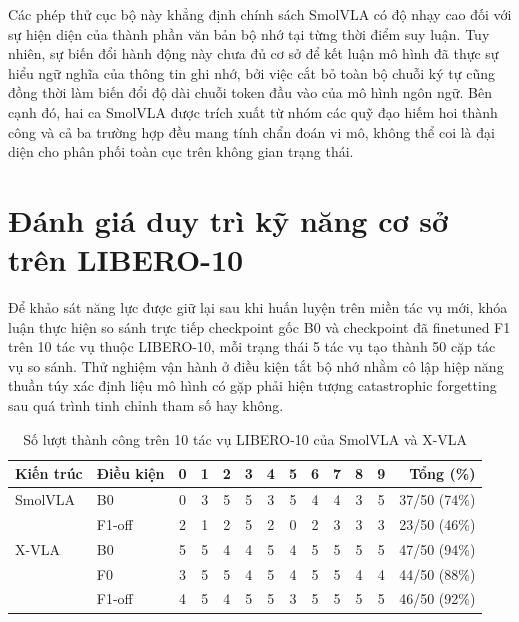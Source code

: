 Các phép thử cục bộ này khẳng định chính sách SmolVLA có độ nhạy cao đối với sự hiện diện của thành phần văn bản bộ nhớ tại từng thời điểm suy luận. Tuy nhiên, sự biến đổi hành động này chưa đủ cơ sở để kết luận mô hình đã thực sự hiểu ngữ nghĩa của thông tin ghi nhớ, bởi việc cắt bỏ toàn bộ chuỗi ký tự cũng đồng thời làm biến đổi độ dài chuỗi token đầu vào của mô hình ngôn ngữ. Bên cạnh đó, hai ca SmolVLA được trích xuất từ nhóm các quỹ đạo hiếm hoi thành công và cả ba trường hợp đều mang tính chẩn đoán vi mô, không thể coi là đại diện cho phân phối toàn cục trên không gian trạng thái.

\section{Đánh giá duy trì kỹ năng cơ sở trên LIBERO-10}
\label{sec:e6-retention}

Để khảo sát năng lực được giữ lại sau khi huấn luyện trên miền tác vụ mới, khóa luận thực hiện so sánh trực tiếp checkpoint gốc B0 và checkpoint đã finetuned F1 trên 10 tác vụ thuộc LIBERO-10, mỗi trạng thái 5 tác vụ tạo thành 50 cặp tác vụ so sánh. Thử nghiệm vận hành ở điều kiện tắt bộ nhớ nhằm cô lập hiệp năng thuần túy xác định liệu mô hình có gặp phải hiện tượng catastrophic forgetting sau quá trình tinh chỉnh tham số hay không.

\begin{table}[htbp]
\centering\small
\caption{Số lượt thành công trên 10 tác vụ LIBERO-10 của SmolVLA và X-VLA}
\label{tab:e6-retention-combined}
\label{tab:e6-retention-results}
\label{tab:xvla-e6-results}
\setlength{\tabcolsep}{2.5pt}
\begin{tabular}{l|l|*{10}{c}|r}
\toprule
\textbf{Kiến trúc} & \textbf{Điều kiện} & \textbf{0} & \textbf{1} & \textbf{2} & \textbf{3} & \textbf{4} & \textbf{5} & \textbf{6} & \textbf{7} & \textbf{8} & \textbf{9} & \textbf{Tổng (\%)} \\
\midrule
SmolVLA & B0     & 0 & 3 & 5 & 5 & 3 & 5 & 4 & 4 & 3 & 5 & 37/50 (74\%) \\
        & F1-off & 2 & 1 & 2 & 5 & 2 & 0 & 2 & 3 & 3 & 3 & 23/50 (46\%) \\
\midrule
X-VLA   & B0     & 5 & 5 & 4 & 4 & 5 & 4 & 5 & 5 & 5 & 5 & 47/50 (94\%) \\
        & F0     & 3 & 5 & 5 & 4 & 5 & 4 & 5 & 5 & 4 & 4 & 44/50 (88\%) \\
        & F1-off & 4 & 5 & 4 & 5 & 5 & 3 & 5 & 5 & 5 & 5 & 46/50 (92\%) \\
\bottomrule
\end{tabular}
\end{table}


